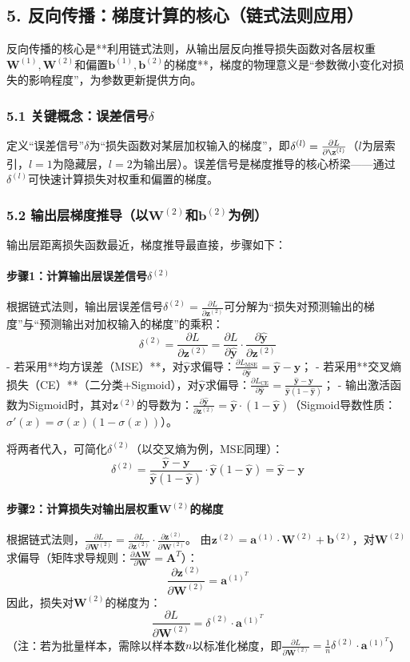 \documentclass[12pt,a4paper]{article}
\newcommand{\Wone}{\mathbf{W}^{(1)}}    %
\newcommand{\Wtwo}{\mathbf{W}^{(2)}}    %
\newcommand{\bone}{\mathbf{b}^{(1)}}    %
\newcommand{\btwo}{\mathbf{b}^{(2)}}    %
\newcommand{\ztwo}{\mathbf{z}^{(2)}}    %
\newcommand{\aone}{\mathbf{a}^{(1)}}    %
\newcommand{\yhat}{\hat{\mathbf{y}}}    %
\newcommand{\ytrue}{\mathbf{y}}         %
\newcommand{\Loss}{L}                   %
\newcommand{\sigmoid}{\sigma}           %
\begin{document}
\subsection{5. 反向传播：梯度计算的核心（链式法则应用）}
反向传播的核心是**利用链式法则，从输出层反向推导损失函数对各层权重\(\Wone,\Wtwo\)和偏置\(\bone,\btwo\)的梯度**，梯度的物理意义是“参数微小变化对损失的影响程度”，为参数更新提供方向。

\subsubsection{5.1 关键概念：误差信号\(\delta\)}
定义“误差信号”\(\delta\)为“损失函数对某层加权输入的梯度”，即\(\delta^{(l)} = \frac{\partial \Loss}{\partial \z^{(l)}}\)（\(l\)为层索引，\(l=1\)为隐藏层，\(l=2\)为输出层）。误差信号是梯度推导的核心桥梁——通过\(\delta^{(l)}\)可快速计算损失对权重和偏置的梯度。


\subsubsection{5.2 输出层梯度推导（以\(\Wtwo\)和\(\btwo\)为例）}
输出层距离损失函数最近，梯度推导最直接，步骤如下：

\paragraph{步骤1：计算输出层误差信号\(\delta^{(2)}\)}
根据链式法则，输出层误差信号\(\delta^{(2)} = \frac{\partial \Loss}{\partial \ztwo}\)可分解为“损失对预测输出的梯度”与“预测输出对加权输入的梯度”的乘积：
\[
\delta^{(2)} = \frac{\partial \Loss}{\partial \ztwo} = \frac{\partial \Loss}{\partial \yhat} \cdot \frac{\partial \yhat}{\partial \ztwo}
\]
- 若采用**均方误差（MSE）**，对\(\yhat\)求偏导：\(\frac{\partial \Loss_{\text{MSE}}}{\partial \yhat} = \yhat - \ytrue\)；
- 若采用**交叉熵损失（CE）**（二分类+Sigmoid），对\(\yhat\)求偏导：\(\frac{\partial \Loss_{\text{CE}}}{\partial \yhat} = \frac{\yhat - \ytrue}{\yhat(1-\yhat)}\)；
- 输出激活函数为Sigmoid时，其对\(\ztwo\)的导数为：\(\frac{\partial \yhat}{\partial \ztwo} = \yhat \cdot (1 - \yhat)\)（Sigmoid导数性质：\(\sigmoid'(x) = \sigmoid(x)(1-\sigmoid(x))\)）。

将两者代入，可简化\(\delta^{(2)}\)（以交叉熵为例，MSE同理）：
\[
\delta^{(2)} = \frac{\yhat - \ytrue}{\yhat(1-\yhat)} \cdot \yhat(1-\yhat) = \yhat - \ytrue
\]

\paragraph{步骤2：计算损失对输出层权重\(\Wtwo\)的梯度}
根据链式法则，\(\frac{\partial \Loss}{\partial \Wtwo} = \frac{\partial \Loss}{\partial \ztwo} \cdot \frac{\partial \ztwo}{\partial \Wtwo}\)。  
由\(\ztwo = \aone \cdot \Wtwo + \btwo\)，对\(\Wtwo\)求偏导（矩阵求导规则：\(\frac{\partial \mathbf{A}\mathbf{W}}{\partial \mathbf{W}} = \mathbf{A}^T\)）：
\[
\frac{\partial \ztwo}{\partial \Wtwo} = \aone^T
\]
因此，损失对\(\Wtwo\)的梯度为：
\[
\frac{\partial \Loss}{\partial \Wtwo} = \delta^{(2)} \cdot \aone^T
\]
（注：若为批量样本，需除以样本数\(n\)以标准化梯度，即\(\frac{\partial \Loss}{\partial \Wtwo} = \frac{1}{n} \delta^{(2)} \cdot \aone^T\)）
\end{document}
